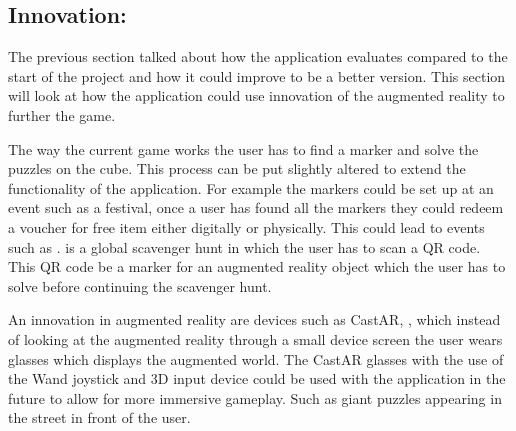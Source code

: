 \subsection{Innovation:}\label{sc:innov}

The previous section talked about how the application evaluates compared to the start of the project and how it could improve to be a better version.
This section will look at how the application could use innovation of the augmented reality to further the game. 

The way the current game works the user has to find a marker and solve the puzzles on the cube.
This process can be put slightly altered to extend the functionality of the application. For example the markers could be set up at an event such as a festival, once a user has found all the markers they could redeem a voucher for free item either digitally or physically.
This could lead to events such as \cite{munzee11}. \cite{munzee11} is a global scavenger hunt in which the user has to scan a QR code. This QR code be a marker for an augmented reality object which the user has to solve before continuing the scavenger hunt.

An innovation in augmented reality are devices such as CastAR, \citealp{castar}, which instead of looking at the augmented reality through a small device screen the user wears glasses which displays the augmented world.
The CastAR glasses with the use of the Wand joystick and 3D input device could be used with the application in the future to allow for more immersive gameplay.
Such as giant puzzles appearing in the street in front of the user.